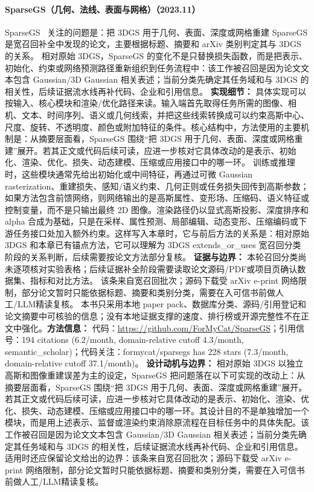 \paragraph{SparseGS（几何、法线、表面与网格）（2023.11）}
SparseGS~\cite{2312_00206} 关注的问题是：把 3DGS 用于几何、表面、深度或网格重建 SparseGS 是宽召回补全中发现的论文，主要根据标题、摘要和 arXiv 类别判定其与 3DGS 的关系。
相对原始 3DGS，SparseGS 的变化不是只替换损失函数，而是把表示、初始化、约束或网络预测路径重新组织到任务流程中：该工作被召回是因为论文文本包含 Gaussian/3D Gaussian 相关表述；当前分类先确定其任务域和与 3DGS 的相关性，后续证据流水线再补代码、企业和引用信息。
\textbf{实现细节：} 具体实现可以按输入、核心模块和渲染/优化路径来读。输入端首先取得任务所需的图像、相机、文本、时间序列、语义或几何线索，并把这些线索转换成可以约束高斯中心、尺度、旋转、不透明度、颜色或附加特征的条件。核心结构中，方法使用的主要机制是：从摘要层面看，SparseGS 围绕“把 3DGS 用于几何、表面、深度或网格重建”展开。若其正文或代码后续可读，应进一步核对它具体改动的是表示、初始化、渲染、优化、损失、动态建模、压缩或应用接口中的哪一环。 训练或推理时，这些模块通常先给出初始化或中间特征，再通过可微 Gaussian rasterization、重建损失、感知/语义约束、几何正则或任务损失回传到高斯参数；如果方法包含前馈网络，则网络输出的是高斯属性、变形场、压缩码、语义特征或控制变量，而不是只输出最终 2D 图像。渲染路径仍以显式高斯投影、深度排序和 alpha 合成为基础，只是在采样、属性预测、局部编辑、动态变形、压缩编码或下游任务接口处加入额外约束。这样写入本章时，它与前后方法的关系是：相对原始 3DGS 和本章已有锚点方法，它可以理解为 3DGS extends\_or\_uses 宽召回分类阶段的关系判断，后续需要按论文方法部分复核。
\textbf{证据与边界：} 本轮召回分类尚未逐项核对实验表格；后续证据补全阶段需要读取论文源码/PDF或项目页确认数据集、指标和对比方法。 该条来自宽召回批次；源码下载受 arXiv e-print 网络限制，部分论文暂时只能依据标题、摘要和类别分类，需要在入可信书前做人工/LLM精读复核。 本书只采用本地 paper pack、数据库分类、源码/引用登记和论文摘要中可核验的信息；没有本地证据支撑的速度、排行榜或开源完整性不在正文中强化。\textbf{方法信息：} 代码：\url{https://github.com/ForMyCat/SparseGS}；引用信号：194 citations (6.2/month, domain-relative cutoff 4.3/month, semantic\_scholar)；代码关注：formycat/sparsegs has 228 stars (7.3/month, domain-relative cutoff 37.1/month)。
\textbf{设计动机与边界：} 相对原始 3DGS 以独立高斯和图像重建误差为主的设定，SparseGS 把问题落在以下可实现的改动上：从摘要层面看，SparseGS 围绕“把 3DGS 用于几何、表面、深度或网格重建”展开。若其正文或代码后续可读，应进一步核对它具体改动的是表示、初始化、渲染、优化、损失、动态建模、压缩或应用接口中的哪一环。其设计目的不是单独增加一个模块，而是用上述表示、监督或渲染约束消除原流程在目标任务中的具体失配。该工作被召回是因为论文文本包含 Gaussian/3D Gaussian 相关表述；当前分类先确定其任务域和与 3DGS 的相关性，后续证据流水线再补代码、企业和引用信息。适用时还应保留论文给出的边界：该条来自宽召回批次；源码下载受 arXiv e-print 网络限制，部分论文暂时只能依据标题、摘要和类别分类，需要在入可信书前做人工/LLM精读复核。
